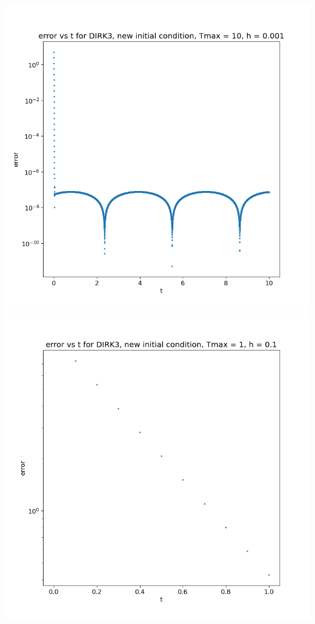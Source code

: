 \documentclass{article}
\begin{document}
\begin{enumerate}[label=(\alph*)]
\begin{center}
	\includegraphics[scale=.3]{hw3 dirk3 err vs t graph 3}
	\includegraphics[scale=.3]{hw3 dirk3 err vs t graph 4}

\end{center}
\end{enumerate}
\end{document}

